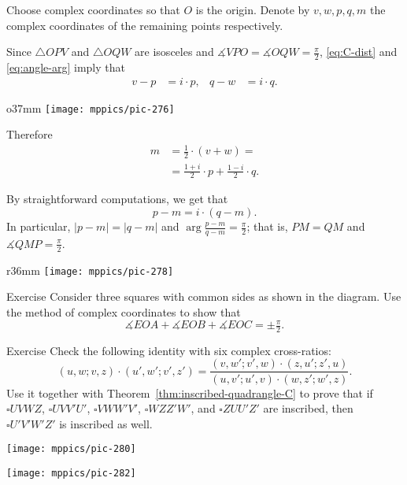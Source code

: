 Choose complex coordinates so that $O$ is the origin.
Denote by $v, w, p, q, m$ the complex coordinates of the remaining points respectively.

Since $\triangle OPV$ and $\triangle OQW$ are isosceles and $\measuredangle VPO=\measuredangle OQW=\tfrac\pi2$,
\ref{eq:C-dist} and \ref{eq:angle-arg} imply that
\begin{align*}
v-p&=i\cdot p,
&
q-w&=i\cdot q.
\end{align*}

\begin{wrapfigure}{o}{37mm}
\centering
\texttt{[image: mppics/pic-276]}
\end{wrapfigure}

Therefore
\begin{align*}
m
&=\tfrac12\cdot(v+w)=
\\
&=\tfrac{1+i}2\cdot p+\tfrac{1-i}2\cdot q.
\end{align*}

By straightforward computations, we get that
\[p-m=i\cdot (q-m).\]
In particular, $|p-m|=|q-m|$ and  $\arg\frac{p-m}{q-m}=\tfrac\pi2$;
that is, $PM=QM$ and $\measuredangle QMP =\tfrac\pi2$.  
\qeds

{

\begin{wrapfigure}{r}{36mm}
\vskip-4mm
\centering
\texttt{[image: mppics/pic-278]}
\end{wrapfigure}

\begin{thm}{Exercise}\label{ex:3-squares}
Consider three squares with common sides as shown in the diagram.
Use the method of complex coordinates to show that 
\[\measuredangle EOA+\measuredangle EOB+\measuredangle EOC=\pm\tfrac\pi2.\]

\end{thm}

}

\begin{thm}{Exercise}\label{ex:6-circles}
Check the following identity with six complex cross-ratios:
\[(u,w;v,z)\cdot(u',w';v',z')=\frac{(v,w';v',w)\cdot(z,u';z',u)}{(u,v';u',v)\cdot(w,z';w',z)}.\]
Use it together with Theorem~\ref{thm:inscribed-quadrangle-C} to prove that if
$\square UVWZ$, $\square UVV'U'$, $\square VWW'V'$, $\square WZZ'W'$, and $\square ZUU'Z'$
are inscribed, then  $\square U'V'W'Z'$ is inscribed as well.

\end{thm}

\begin{minipage}{.47\textwidth}
\centering
\texttt{[image: mppics/pic-280]}
\end{minipage}
\hfill
\begin{minipage}{.47\textwidth}
\centering
\texttt{[image: mppics/pic-282]}
\end{minipage}

